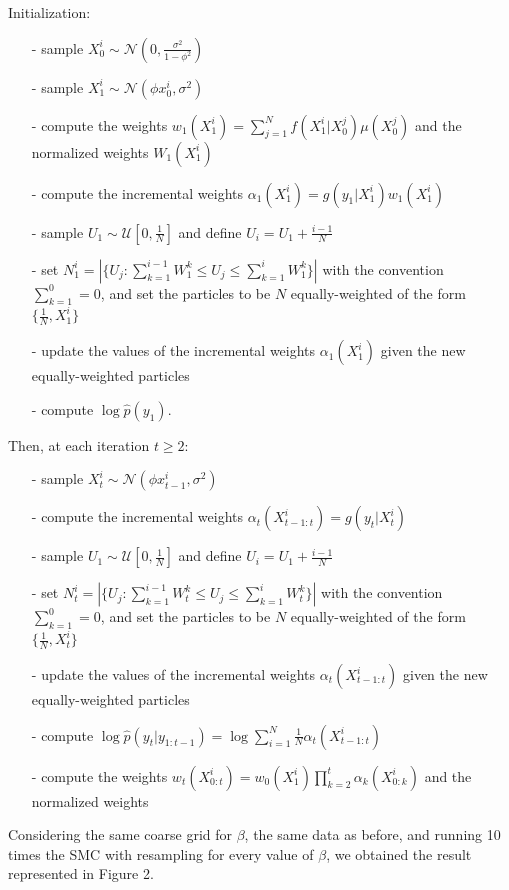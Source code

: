 \documentclass[]{article}
\begin{document}
Initialization:
\begin{enumerate}
	\item[-] sample $X_0^i \sim \mathcal{N}(0, \frac{\sigma^2}{1-\phi^2})$
	\item[-] sample $X_1^i \sim \mathcal{N}(\phi x_0^i,\sigma^2) $ 
	\item[-] compute the weights $w_1(X_1^i) = \sum_{j=1}^{N}f(X_1^i|X_0^j)\mu(X_0^j)$ and the normalized weights $W_1(X_1^i)$
	\item[-] compute the incremental weights $ \alpha_1(X_1^i) = g(y_1|X_1^i)w_1(X_1^i) $
	\item[-] sample $U_1 \sim \mathcal{U}[0, \frac{1}{N}]$ and define $U_i = U_1 + \frac{i-1}{N}$
	\item[-] set $N_1^i = |\{ U_j: \sum_{k=1}^{i-1}W_1^k \leq U_j \leq \sum_{k=1}^{i}W_1^k \}|$ with the convention $\sum_{k=1}^{0}=0$, and set the particles to be $N$ equally-weighted of the form $\{\frac{1}{N}, X_1^i\}$
	\item[-] update the values of the incremental weights  $ \alpha_1(X_1^i) $ given the new equally-weighted particles
	\item[-] compute $\log \hat{p}(y_1)$. 
\end{enumerate}
Then, at each iteration $t \geq 2$:
\begin{enumerate}
	\item[-] sample $X_t^i \sim \mathcal{N}(\phi x_{t-1}^i,\sigma^2) $
	\item[-] compute the incremental weights $ \alpha_t(X_{t-1:t}^i) = g(y_t|X_t^i) $
	\item[-] sample $U_1 \sim \mathcal{U}[0, \frac{1}{N}]$ and define $U_i = U_1 + \frac{i-1}{N}$
	\item[-] set $N_t^i = |\{ U_j: \sum_{k=1}^{i-1}W_t^k \leq U_j \leq \sum_{k=1}^{i}W_t^k \}|$ with the convention $\sum_{k=1}^{0}=0$, and set the particles to be $N$ equally-weighted of the form $\{\frac{1}{N}, X_t^i\}$
	\item[-] update the values of the incremental weights  $ \alpha_t(X_{t-1:t}^i) $ given the new equally-weighted particles
	\item[-] compute $\log \hat{p}(y_t|y_{1:t-1})=\log\sum_{i=1}^{N}\frac{1}{N}\alpha_t(X_{t-1:t}^i)$
	\item[-] compute the weights $
	w_t(X_{0:t}^i)=w_0(X_1^i)\prod_{k=2}^{t}\alpha_k(X_{0:k}^i)$ and the normalized weights
\end{enumerate}
Considering the same coarse grid for $\beta$, the same data as before, and running 10 times the SMC with resampling for every value of $\beta$, we obtained the result represented in Figure 2.
\end{document}
